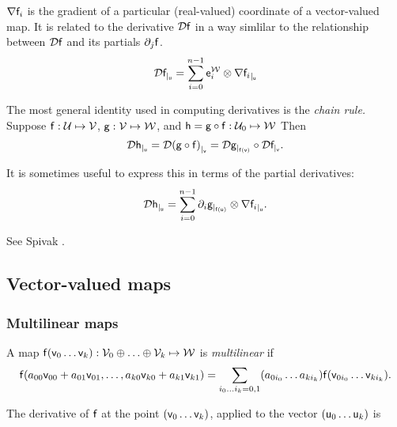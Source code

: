 ${\mathbf \nabla}{\mathsf{f}_i}$ is the gradient of a particular (real-valued) coordinate
of a vector-valued map. It is related to the derivative ${\mathcal{D}{\mathsf{f}}}$
in a way simlilar to the relationship between ${\mathcal{D}{\mathsf{f}}}$ and its partials ${\partial}_{j}{\mathsf{f}}$.
\begin{equation}
{\mathcal{D}{\mathsf{f}}_{\mid_{\mathsf{u}}}} = \sum_{i=0}^{n-1}  \mathsf{e}_i^{\mathcal{W}} \otimes {\mathbf \nabla}{\mathsf{f}_i}_{\mid_{\mathsf{u}}}
\end{equation}

The most general identity used in computing derivatives is the {\it chain rule.}
Suppose
$\mathsf{f}:\mathcal{U} \mapsto \mathcal{V}$,
$\mathsf{g}:\mathcal{V} \mapsto \mathcal{W}$,
and
$\mathsf{h} = \mathsf{g} \circ \mathsf{f} : \mathcal{U}_0 \mapsto \mathcal{W}$
Then
\begin{equation}
\label{eq:chain-rule}
{\mathcal{D}{\mathsf{h}}_{\mid_{\mathsf{u}}}}
=  {\mathcal{D}{(\mathsf{g} \circ \mathsf{f})}_{\mid_{\mathsf{v}}}}
=  {\mathcal{D}{\mathsf{g}}_{\mid_{\mathsf{f}(\mathsf{v})}}}  \circ  {\mathcal{D}{\mathsf{f}}_{\mid_{\mathsf{v}}}}.
\end{equation}

It is sometimes useful to express this in terms of the partial derivatives:
\begin{equation}
\label{eq:chain-rule_partials}
{\mathcal{D}{\mathsf{h}}_{\mid_{\mathsf{u}}}} =  \sum_{i=0}^{n-1} {\partial}_{i}{\mathsf{g}}_{\mid_{\mathsf{f}(\mathsf{u})}} \otimes  {\mathbf \nabla}{\mathsf{f}_i}_{\mid_{\mathsf{u}}}.
\end{equation}

See Spivak \cite[Theorem~2-2]{spivak-1965}.



\subsection{Vector-valued maps}


\subsubsection{Multilinear maps}
\label{sec:Multilinear-maps}

A map $\mathsf{f}(\mathsf{v}_0 \ldots \mathsf{v}_k):\mathcal{V}_0 \oplus \ldots \oplus \mathcal{V}_k \mapsto \mathcal{W}$
is {\it multilinear} if
\begin{equation}
\mathsf{f}(a_{00} \mathsf{v}_{00} + a_{01} \mathsf{v}_{01}, \ldots, a_{k0} \mathsf{v}_{k0} + a_{k1} \mathsf{v}_{k1})
 =  \sum_{i_0 \ldots i_k = 0,1} (a_{0i_0} \ldots a_{ki_k}) \mathsf{f}(\mathsf{v}_{0i_0} \ldots \mathsf{v}_{ki_k}).
\end{equation}

The derivative of $\mathsf{f}$
at the point $(\mathsf{v}_0 \ldots \mathsf{v}_k)$, applied to the vector $(\mathsf{u}_0 \ldots \mathsf{u}_k)$ is

